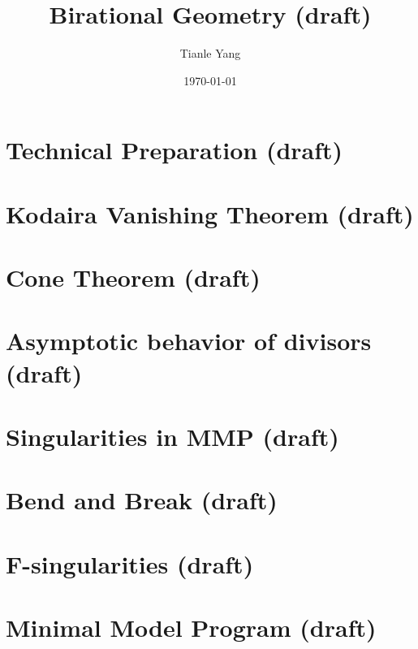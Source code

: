 \documentclass[sectionlevel=chapter]{noteformyself}
\title{Birational Geometry (draft)}
\author{Tianle Yang}
\date{\today}
\begin{document}
    \maketitle

    \tableofcontents

    \section{Technical Preparation (draft)}
    
    \section{Kodaira Vanishing Theorem (draft)}
    
    \section{Cone Theorem (draft)}
    
    \section{Asymptotic behavior of divisors (draft)}
    
    \section{Singularities in MMP (draft)}
    
    \section{Bend and Break (draft)}
    
    \section{F-singularities (draft)}
    
    \section{Minimal Model Program (draft)}
    

    \printbibliography[heading=bibintoc, title={References}]
\end{document}
